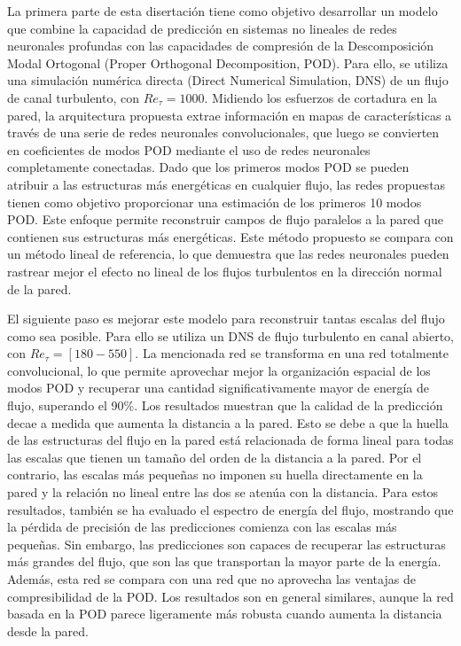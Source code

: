 \begin{abstrakt}
	La primera parte de esta disertación tiene como objetivo desarrollar un modelo que combine la capacidad de predicción en sistemas no lineales de redes neuronales profundas con las capacidades de compresión de la Descomposición Modal Ortogonal (Proper Orthogonal Decomposition, POD).
	Para ello, se utiliza una simulación numérica directa (Direct Numerical Simulation, DNS) de un flujo de canal turbulento, con $Re_{\tau}=1000$.
	Midiendo los esfuerzos de cortadura en la pared, la arquitectura propuesta extrae información en mapas de características a través de una serie de redes neuronales convolucionales, que luego se convierten en coeficientes de modos POD mediante el uso de redes neuronales completamente conectadas.
	Dado que los primeros modos POD se pueden atribuir a las estructuras más energéticas en cualquier flujo, las redes propuestas tienen como objetivo proporcionar una estimación de los primeros 10 modos POD.
	Este enfoque permite reconstruir campos de flujo paralelos a la pared que contienen sus estructuras más energéticas.
	Este método propuesto se compara con un método lineal de referencia, lo que demuestra que las redes neuronales pueden rastrear mejor el efecto no lineal de los flujos turbulentos en la dirección normal de la pared.

	El siguiente paso es mejorar este modelo para reconstruir tantas escalas del flujo como sea posible.
	Para ello se utiliza un DNS de flujo turbulento en canal abierto, con $Re_{\tau}=[180-550]$.
	La mencionada red se transforma en una red totalmente convolucional, lo que permite aprovechar mejor la organización espacial de los modos POD y recuperar una cantidad significativamente mayor de energía de flujo, superando el 90\%.
	Los resultados muestran que la calidad de la predicción decae a medida que aumenta la distancia a la pared.
	Esto se debe a que la huella de las estructuras del flujo en la pared está relacionada de forma lineal para todas las escalas que tienen un tamaño del orden de la distancia a la pared.
	Por el contrario, las escalas más pequeñas no imponen su huella directamente en la pared y la relación no lineal entre las dos se atenúa con la distancia.
	Para estos resultados, también se ha evaluado el espectro de energía del flujo, mostrando que la pérdida de precisión de las predicciones comienza con las escalas más pequeñas.
	Sin embargo, las predicciones son capaces de recuperar las estructuras más grandes del flujo, que son las que transportan la mayor parte de la energía.
	Además, esta red se compara con una red que no aprovecha las ventajas de compresibilidad de la POD.
	Los resultados son en general similares, aunque la red basada en la POD parece ligeramente más robusta cuando aumenta la distancia desde la pared.


\end{abstrakt}
